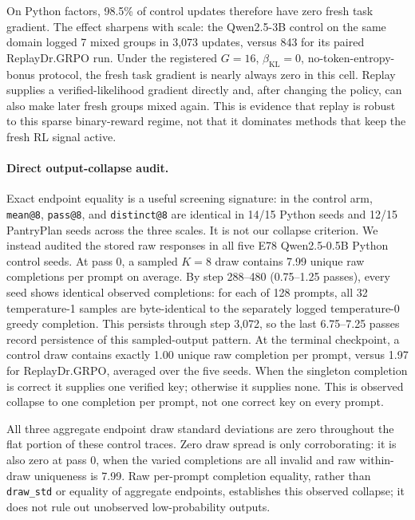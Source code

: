 On Python factors, 98.5\% of control updates therefore have zero
fresh task gradient. The effect sharpens with scale: the Qwen2.5-3B control
on the same domain logged 7 mixed groups in 3{,}073 updates, versus 843 for its
paired ReplayDr.GRPO run. Under the registered \(G=16\),
\(\beta_{\mathrm{KL}}=0\), no-token-entropy-bonus protocol, the fresh task gradient
is nearly always zero in this cell. Replay supplies a verified-likelihood
gradient directly and, after changing the policy, can also make later fresh
groups mixed again. This is evidence that replay is robust to this sparse
binary-reward regime, not that it dominates methods that keep the fresh RL
signal active.

\paragraph{Direct output-collapse audit.}
Exact endpoint equality is a useful screening signature: in the control arm,
\texttt{mean@8}, \texttt{pass@8}, and \texttt{distinct@8} are identical in
14/15 Python seeds and 12/15 PantryPlan seeds across the three scales. It is not
our collapse criterion. We instead audited the stored raw responses in all five
E78 Qwen2.5-0.5B Python control seeds. At pass 0, a sampled \(K=8\) draw contains
7.99 unique raw completions per prompt on average. By step 288--480
(0.75--1.25 passes), every seed shows identical observed completions: for each
of 128 prompts, all 32 temperature-1 samples are byte-identical to the
separately logged temperature-0 greedy completion. This persists through step 3,072, so the last
6.75--7.25 passes record persistence of this sampled-output pattern. At the
terminal checkpoint, a control draw contains exactly 1.00 unique raw completion
per prompt, versus 1.97 for ReplayDr.GRPO, averaged over the five seeds. When the
singleton completion is correct it supplies one verified key; otherwise it
supplies none. This is observed collapse to one completion per prompt, not one
correct key on every prompt.

All three aggregate endpoint draw standard deviations are zero throughout the
flat portion of these control traces. Zero draw spread is only corroborating:
it is also zero at pass 0, when the varied completions are all invalid and raw
within-draw uniqueness is 7.99. Raw per-prompt completion equality, rather than
\texttt{draw\_std} or equality of aggregate endpoints, establishes this
observed collapse; it does not rule out unobserved low-probability outputs.

